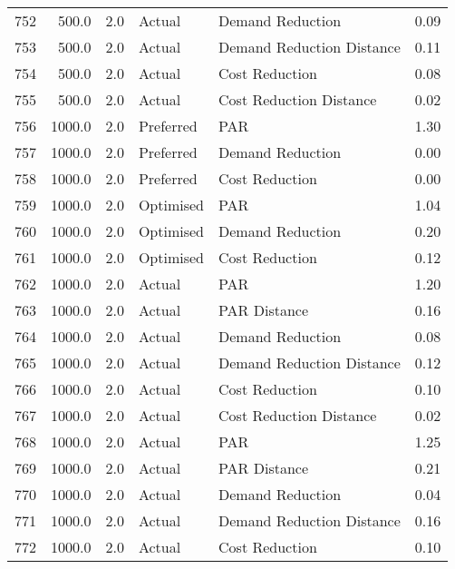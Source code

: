 \begin{longtable}{lrrllr}
752  &        500.0 &     2.0 &         Actual &           Demand Reduction &   0.09 \\
753  &        500.0 &     2.0 &         Actual &  Demand Reduction Distance &   0.11 \\
754  &        500.0 &     2.0 &         Actual &             Cost Reduction &   0.08 \\
755  &        500.0 &     2.0 &         Actual &    Cost Reduction Distance &   0.02 \\
756  &       1000.0 &     2.0 &      Preferred &                        PAR &   1.30 \\
757  &       1000.0 &     2.0 &      Preferred &           Demand Reduction &   0.00 \\
758  &       1000.0 &     2.0 &      Preferred &             Cost Reduction &   0.00 \\
759  &       1000.0 &     2.0 &      Optimised &                        PAR &   1.04 \\
760  &       1000.0 &     2.0 &      Optimised &           Demand Reduction &   0.20 \\
761  &       1000.0 &     2.0 &      Optimised &             Cost Reduction &   0.12 \\
762  &       1000.0 &     2.0 &         Actual &                        PAR &   1.20 \\
763  &       1000.0 &     2.0 &         Actual &               PAR Distance &   0.16 \\
764  &       1000.0 &     2.0 &         Actual &           Demand Reduction &   0.08 \\
765  &       1000.0 &     2.0 &         Actual &  Demand Reduction Distance &   0.12 \\
766  &       1000.0 &     2.0 &         Actual &             Cost Reduction &   0.10 \\
767  &       1000.0 &     2.0 &         Actual &    Cost Reduction Distance &   0.02 \\
768  &       1000.0 &     2.0 &         Actual &                        PAR &   1.25 \\
769  &       1000.0 &     2.0 &         Actual &               PAR Distance &   0.21 \\
770  &       1000.0 &     2.0 &         Actual &           Demand Reduction &   0.04 \\
771  &       1000.0 &     2.0 &         Actual &  Demand Reduction Distance &   0.16 \\
772  &       1000.0 &     2.0 &         Actual &             Cost Reduction &   0.10 \\

\end{longtable}
